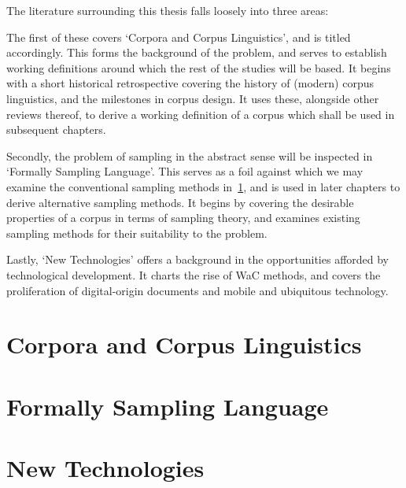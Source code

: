 The literature surrounding this thesis falls loosely into three areas:  

The first of these covers `Corpora and Corpus Linguistics', and is titled accordingly.  This forms the background of the problem, and serves to establish working definitions around which the rest of the studies will be based.  It begins with a short historical retrospective covering the history of (modern) corpus linguistics, and the milestones in corpus design.  It uses these, alongside other reviews thereof, to derive a working definition of a corpus which shall be used in subsequent chapters.

Secondly, the problem of sampling in the abstract sense will be inspected in `Formally Sampling Language'.  This serves as a foil against which we may examine the conventional sampling methods in~\ref{sec:litreview-corpora}, and is used in later chapters  to derive alternative sampling methods.    It begins by covering the desirable properties of a corpus in terms of sampling theory, and examines existing sampling methods for their suitability to the problem.


Lastly, `New Technologies' offers a background in the opportunities afforded by technological development.  It charts the rise of WaC methods, and covers the proliferation of digital-origin documents and mobile and ubiquitous technology.




\section{Corpora and Corpus Linguistics}
\label{sec:litreview-corpora}




\section{Formally Sampling Language}
\label{sec:litreview-sampling}




\section{New Technologies} %
\label{sec:litreview-newtech}



